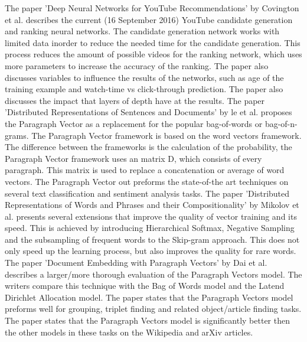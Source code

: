\documentclass[../../Thesis.tex]{subfiles}
\begin{document}
The paper 'Deep Neural Networks for YouTube Recommendations' by Covington et al.\cite{covington2016deep} describes the current (16 September 2016) YouTube candidate generation and ranking neural networks. The candidate generation network works with limited data inorder to reduce the needed time for the candidate generation. This process reduces the amount of possible videos for the ranking network, which uses more parameters to increase the accuracy of the ranking. The paper also discusses variables to influence the results of the networks, such as age of the training example and watch-time vs click-through prediction. The paper also discusses the impact that layers of depth have at the results.
The paper 'Distributed Representations of Sentences and Documents' by le et al.\cite{le2014distributed} proposes the Paragraph Vector as a replacement for the popular bag-of-words or bag-of-n-grams. The Paragraph Vector framework is based on the word vectors framework. The difference between the frameworks is the calculation of the probability, the Paragraph Vector framework uses an matrix D, which consists of every paragraph. This matrix is used to replace a concatenation or average of word vectors. The Paragraph Vector out preforms the state-of-the art techniques on several text classification and sentiment analysis tasks.
The paper 'Distributed Representations of Words and Phrases and their Compositionality' by Mikolov et al.\cite{mikolov2013distributed} presents several extensions that improve the quality of vector training and its speed. This is achieved by introducing Hierarchical Softmax, Negative Sampling and the subsampling of frequent words to the Skip-gram approach. This does not only speed up the learning process, but also improves the quality for rare words.
The paper 'Document Embedding with Paragraph Vectors' by Dai et al.\cite{dai2015document} describes a larger/more thorough evaluation of the Paragraph Vectors model. The writers compare this technique with the Bag of Words model and the Latend Dirichlet Allocation model. The paper states that the Paragraph Vectors model preforms well for grouping, triplet finding and related object/article finding tasks. The paper states that the Paragraph Vectors model is significantly better then the other models in these tasks on the Wikipedia and arXiv articles.
\end{document}
